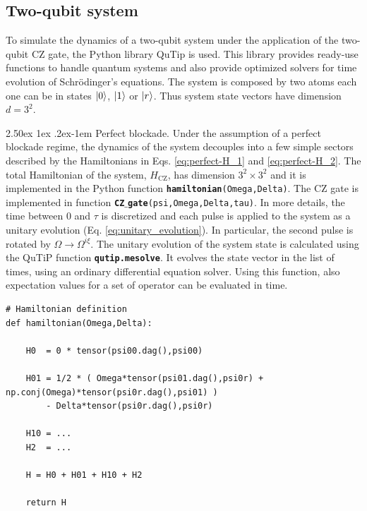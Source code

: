 \documentclass[rmp,10pt,onecolumn,fleqn,notitlepage]{revtex4-1}
\makeatletter
\renewcommand{\paragraph}{%
    \@startsection{paragraph}{4}%
    {\z@}{2.50ex \@plus 1ex \@minus .2ex}{-1em}%
    {\bf\sffamily}%
}
\makeatother
\begin{document}
\subsection{Two-qubit system}

To simulate the dynamics of a two-qubit system under the application of the two-qubit CZ gate, the Python library QuTip is used. This library provides ready-use functions to handle quantum systems and also provide optimized solvers for time evolution of Schrödinger's equations.
The system is composed by two atoms each one can be in states $\left\vert{0}\right\rangle$, $\left\vert{1}\right\rangle$ or $\left\vert{r}\right\rangle$. Thus system state vectors have dimension $d=3^2$.

\paragraph{Perfect blockade.} Under the assumption of a perfect blockade regime, the dynamics of the system decouples into a few simple sectors described by the Hamiltonians in Eqs. \eqref{eq:perfect-H_1} and \eqref{eq:perfect-H_2}. 
The total Hamiltonian of the system, $H_{\text{CZ}}$, has dimension $3^2 \times 3^2$ and it is implemented in the Python function  {\bfseries\texttt{hamiltonian}}\texttt{(Omega,Delta)}.
The CZ gate is implemented in function  {\bfseries\texttt{CZ$\_$gate}}\texttt{(psi,Omega,Delta,tau)}. In more details, the time between 0 and $\tau$ is discretized and each pulse is applied to the system as a unitary evolution (Eq. \eqref{eq:unitary_evolution}). In particular, the second pulse is rotated by $\Omega \rightarrow \Omega^{i\xi}$. The unitary evolution of the system state is calculated using the QuTiP function {\bfseries\texttt{qutip.mesolve}}. It evolves the state vector in the list of times, using an ordinary differential equation solver. Using this function, also expectation values for a set of operator can be evaluated in time.

\begin{lstlisting}[style=myPython]
# Hamiltonian definition
def hamiltonian(Omega,Delta):
    
    H0  = 0 * tensor(psi00.dag(),psi00)
    
    H01 = 1/2 * ( Omega*tensor(psi01.dag(),psi0r) + np.conj(Omega)*tensor(psi0r.dag(),psi01) ) 
        - Delta*tensor(psi0r.dag(),psi0r)
    
    H10 = ...
    H2  = ...

    H = H0 + H01 + H10 + H2
    
    return H
\end{lstlisting}
\end{document}
